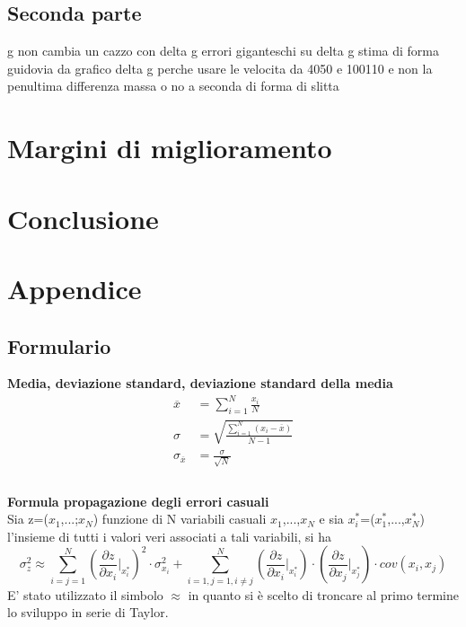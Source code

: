 \documentclass[a4paper,11pt,oneside]{article}
\begin{document}
\subsection{Seconda parte}
g non cambia un cazzo con delta g
errori giganteschi su delta g
stima di forma guidovia da grafico delta g
perche usare le velocita da 4050 e 100110 e non la penultima
differenza massa o no a seconda di forma di slitta



\section{Margini di miglioramento}
\section{Conclusione}



\newpage
\section{Appendice}
\subsection{Formulario}
\textbf{Media, deviazione standard, deviazione standard della media}
\begin{equation*}
    \begin{aligned}
        \overline{x}&=\sum\limits_{i=1}^{N} \frac{x_{i}}{N}\\
        \sigma&=\sqrt{\frac{\sum\limits_{i=1}^{N} (x_{i}-\overline{x})}{N-1}}\\
        \sigma_{\overline{x}}&=\frac{\sigma}{\sqrt{N}}\\
    \end{aligned}
\end{equation*}\\

\textbf{Formula propagazione degli errori casuali}\\

Sia z=($x_1$,...;$x_N$) funzione di N variabili casuali $x_1$,...,$x_N$ e sia ${x_i^\ast}$=($x_1^\ast$,...,$x_N^{\ast}$) l'insieme di tutti i valori veri associati a tali variabili, si ha 
\begin{equation*}
    \sigma_z^{2}\approx  \sum_{i=j=1}^{N}\left ( \frac{\partial z}{\partial x_i}\Big|_{x_i^{\ast}} \right )^{2}\cdot\sigma_{x_i}^{2} +\sum_{i=1,j=1,i\neq j}^{N}\left (\frac{\partial z }{\partial x_i}\Big|_{x_i^{\ast}} \right ) \cdot \left ( \frac{\partial z}{\partial x_j} \Big|_{x_j^{\ast}} \right )\cdot cov(x_i,x_j)\label{eq:teorema_varianze}
\end{equation*}
E' stato utilizzato il simbolo $\approx$ in quanto si è scelto di troncare al primo termine lo sviluppo in serie di Taylor.\\
\end{document}
